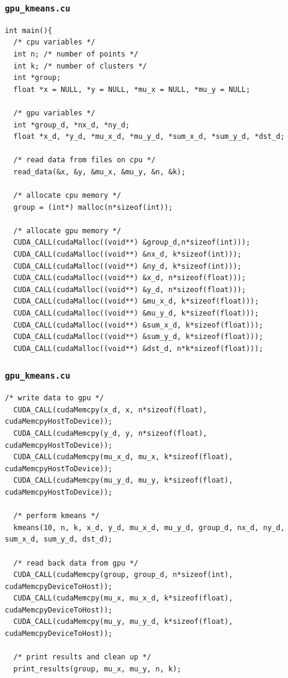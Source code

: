 \documentclass[handout]{beamer}
\numberwithin{equation}{section}
\begin{document}
\begin{frame}[fragile]
\frametitle{{\tt gpu\_kmeans.cu}}
\begin{lstlisting}[name=km]
int main(){
  /* cpu variables */
  int n; /* number of points */
  int k; /* number of clusters */
  int *group;
  float *x = NULL, *y = NULL, *mu_x = NULL, *mu_y = NULL;

  /* gpu variables */
  int *group_d, *nx_d, *ny_d;
  float *x_d, *y_d, *mu_x_d, *mu_y_d, *sum_x_d, *sum_y_d, *dst_d;

  /* read data from files on cpu */
  read_data(&x, &y, &mu_x, &mu_y, &n, &k);

  /* allocate cpu memory */
  group = (int*) malloc(n*sizeof(int));
  
  /* allocate gpu memory */
  CUDA_CALL(cudaMalloc((void**) &group_d,n*sizeof(int)));
  CUDA_CALL(cudaMalloc((void**) &nx_d, k*sizeof(int)));
  CUDA_CALL(cudaMalloc((void**) &ny_d, k*sizeof(int)));
  CUDA_CALL(cudaMalloc((void**) &x_d, n*sizeof(float)));
  CUDA_CALL(cudaMalloc((void**) &y_d, n*sizeof(float)));
  CUDA_CALL(cudaMalloc((void**) &mu_x_d, k*sizeof(float)));
  CUDA_CALL(cudaMalloc((void**) &mu_y_d, k*sizeof(float)));
  CUDA_CALL(cudaMalloc((void**) &sum_x_d, k*sizeof(float)));
  CUDA_CALL(cudaMalloc((void**) &sum_y_d, k*sizeof(float)));
  CUDA_CALL(cudaMalloc((void**) &dst_d, n*k*sizeof(float)));
\end{lstlisting}
\end{frame}

\begin{frame}[fragile]
\frametitle{{\tt gpu\_kmeans.cu}}
\begin{lstlisting}[name=km]
  /* write data to gpu */
  CUDA_CALL(cudaMemcpy(x_d, x, n*sizeof(float), cudaMemcpyHostToDevice));
  CUDA_CALL(cudaMemcpy(y_d, y, n*sizeof(float), cudaMemcpyHostToDevice));
  CUDA_CALL(cudaMemcpy(mu_x_d, mu_x, k*sizeof(float), cudaMemcpyHostToDevice));
  CUDA_CALL(cudaMemcpy(mu_y_d, mu_y, k*sizeof(float), cudaMemcpyHostToDevice));

  /* perform kmeans */
  kmeans(10, n, k, x_d, y_d, mu_x_d, mu_y_d, group_d, nx_d, ny_d, sum_x_d, sum_y_d, dst_d);
  
  /* read back data from gpu */
  CUDA_CALL(cudaMemcpy(group, group_d, n*sizeof(int), cudaMemcpyDeviceToHost));
  CUDA_CALL(cudaMemcpy(mu_x, mu_x_d, k*sizeof(float), cudaMemcpyDeviceToHost));
  CUDA_CALL(cudaMemcpy(mu_y, mu_y_d, k*sizeof(float), cudaMemcpyDeviceToHost));

  /* print results and clean up */  
  print_results(group, mu_x, mu_y, n, k);
\end{lstlisting}
\end{frame}
\end{document}
